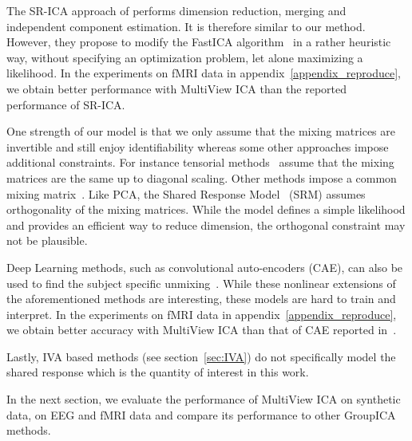 The SR-ICA approach of \cite{zhang2016searchlight} performs dimension reduction, merging and independent component estimation. It is therefore similar to our method.
However, they propose to modify the FastICA algorithm~\cite{hyvarinen1999fast} in a rather heuristic way, without specifying an optimization problem, let alone maximizing a likelihood. In the experiments on fMRI data in appendix~\ref{appendix_reproduce}, we obtain better performance with MultiView ICA than the reported performance of SR-ICA.

One strength of our model is that we only assume that the mixing matrices are invertible and still enjoy identifiability whereas some other approaches impose additional constraints. For instance tensorial methods~\cite{beckmann2005tensorial} assume that the mixing matrices are the same up to diagonal scaling.
Other methods impose a common mixing matrix~\cite{cong2013validating, grin2010independent, calhoun2001fmri, Monti18UAI}. Like PCA, the Shared Response Model~\cite{chen2015reduced} (SRM) assumes orthogonality of the mixing matrices. While the model defines a simple likelihood and provides an efficient way to reduce dimension, the orthogonal constraint may not be plausible.

Deep Learning methods, such as convolutional auto-encoders (CAE), can also be used to find the subject specific unmixing~\cite{chen2016convolutional}. While these nonlinear extensions of the aforementioned methods are interesting, these models are hard to train and interpret. In the experiments on fMRI data in appendix~\ref{appendix_reproduce}, we obtain better accuracy with MultiView ICA than that of CAE reported in~\cite{chen2016convolutional}.

Lastly, IVA based methods (see section~\ref{sec:IVA}) do not specifically model
the shared response which is the quantity of interest in this work.

In the next section, we evaluate the performance of MultiView ICA on synthetic
data, on EEG and fMRI data and compare its performance to other GroupICA methods.